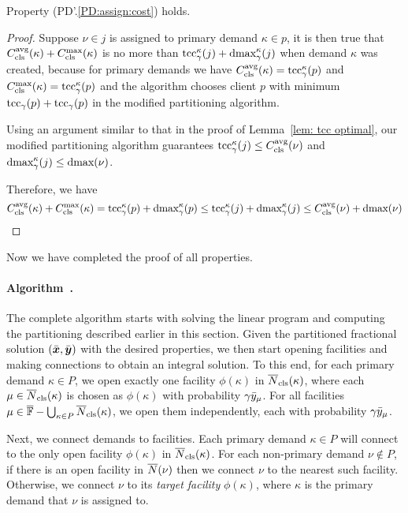\begin{lemma}\label{lem: PD1: primary optimal}
  Property (PD'.\ref{PD:assign:cost}) holds.
\end{lemma}
\begin{proof}
  Suppose $\nu \in j$ is assigned to primary demand $\kappa \in p$, it
  is then true that $C_{\text{cls}}^{{\mbox{\scriptsize\rm avg}}}(\kappa) + C_{\text{cls}}^{\max}(\kappa)$ is no more
  than $\textrm{tcc}_\gamma^\kappa(j) + \text{dmax}_{\gamma}^\kappa(j)$ when demand
  $\kappa$ was created, because for primary demands we have
  $C_{\text{cls}}^{{\mbox{\scriptsize\rm avg}}}(\kappa) = \textrm{tcc}_\gamma^\kappa (p)$ and $C_{\text{cls}}^{\max}(\kappa) =
  \textrm{tcc}_{\gamma}^\kappa(p)$ and the algorithm chooses client $p$ with
  minimum $\textrm{tcc}_{\gamma}(p) + \textrm{tcc}_{\gamma}(p)$ in the modified
  partitioning algorithm.

  Using an argument similar to that in the proof of Lemma~\ref{lem:
    tcc optimal}, our modified partitioning algorithm guarantees
  $\textrm{tcc}_{\gamma}^{\kappa}(j) \leq C_{\text{cls}}^{{\mbox{\scriptsize\rm avg}}}(\nu)$ and
  $\text{dmax}_{\gamma}^{\kappa}(j) \leq \text{dmax}(\nu)$.

  Therefore, we have
  \begin{equation*}
    C_{\text{cls}}^{{\mbox{\scriptsize\rm avg}}}(\kappa) + C_{\text{cls}}^{\max}(\kappa) = \textrm{tcc}_{\gamma}^{\kappa}(p) +
    \text{dmax}_{\gamma}^{\kappa}(p) \leq \textrm{tcc}_{\gamma}^{\kappa}(j) +
    \text{dmax}_{\gamma}^{\kappa}(j) \leq C_{\text{cls}}^{{\mbox{\scriptsize\rm avg}}}(\nu) + \text{dmax}(\nu)
  \end{equation*}
\end{proof}
Now we have completed the proof of all properties.

\paragraph{Algorithm~{\EBGS}.}
The complete algorithm starts with solving the linear program and
computing the partitioning described earlier in this section.
Given the partitioned fractional solution $(\bar{\boldsymbol{x}},
\bar{\boldsymbol{y}})$ with the desired properties, we then start opening
facilities and making connections to obtain an integral
solution. To this end, for each primary demand $\kappa\in P$,
we open exactly one facility $\phi(\kappa)$ in ${\overline{N}}_{\text{cls}}(\kappa)$,
where each $\mu\in{\overline{N}}_{\text{cls}}(\kappa)$ is chosen as $\phi(\kappa)$ with probability
$\gamma{\bar y}_{\mu}$. For all facilities
 $\mu\in\overline{\mathbb{F}} - \bigcup_{\kappa\in P}{\overline{N}}_{\text{cls}}(\kappa)$,
we open them independently, each with
probability $\gamma{\bar y}_{\mu}$. 

Next, we connect demands to facilities.
Each primary demand $\kappa\in P$ will connect
to the only open facility $\phi(\kappa)$ in ${\overline{N}}_{\text{cls}}(\kappa)$.  
For each non-primary demand $\nu\notin P$, if
there is an open facility in ${\overline{N}}(\nu)$ then we connect
$\nu$ to the nearest such facility. Otherwise, we connect
$\nu$ to its \emph{target facility} $\phi(\kappa)$, where $\kappa$ is the primary
demand that $\nu$ is assigned to. 


